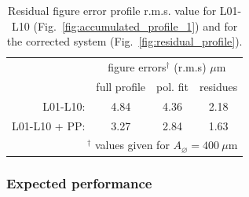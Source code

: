 \begin{refsection}
\begin{table}[h]
    \caption[Residual figure error profile value for L01-L10 and for the corrected system]{Residual figure error profile r.m.s. value for L01-L10 (Fig.~\ref{fig:accumulated_profile_1}) and for the corrected system (Fig.~\ref{fig:residual_profile}).}
    \centering
    \label{tab:corrected}\small
    \begin{tabular}{rccc}
    \hline \hline
    &\multicolumn{3}{c}{figure errors$^\dagger$ (r.m.s) $\mu$m}\\ \cline{2-4}
    &full profile & pol. fit   & residues \\ \hline
    L01-L10:      &4.84  &4.36  &2.18\\
    L01-L10 + PP: &3.27  &2.84  &1.63\\
    \hline \hline
    \multicolumn{4}{r}{\footnotesize{$^\dagger$ values given for $A_{\diameter}=400~\mu\text{m}$}}     
    \end{tabular}
\end{table}

\begin{table}[h]
    \caption[Strehl ratio for L01-L10 and for the corrected system]{Comparison of the Strehl ratio for aberrated system composed of L01-L10 and the corrected system as shown in Fig.~\ref{fig:Strehl_correction}.}\label{tab:Strehl_corrected}%
\end{table}{}

\subsubsection*{Expected performance}


\end{refsection}

